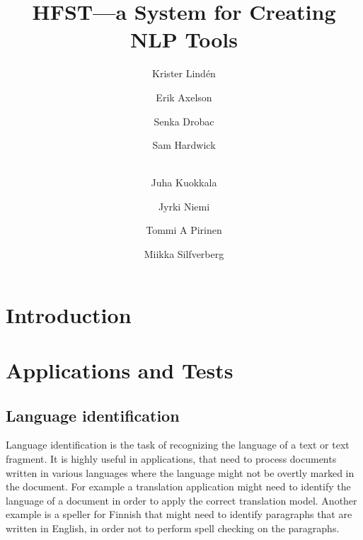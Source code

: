 \documentclass{llncs}
\begin{document}
%
\title{HFST---a System for Creating NLP Tools}
%
\author{Krister Lind\'{e}n \and Erik Axelson \and Senka Drobac \and Sam Hardwick \and\\
Juha Kuokkala \and Jyrki Niemi \and Tommi A Pirinen \and Miikka Silfverberg}


\maketitle


\begin{abstract}
\end{abstract}


\section*{Introduction}

\section{Applications and Tests}\label{hfst:structural-layout}

\subsection{Language identification}
Language identification is the task of recognizing the language of a
text or text fragment. It is highly useful in applications, that need
to process documents written in various languages where the language
might not be overtly marked in the document. For example a translation
application might need to identify the language of a document in order
to apply the correct translation model. Another example is a speller for
Finnish that might need to identify paragraphs that are written in
English, in order not to perform spell checking on the paragraphs.
\end{document}
